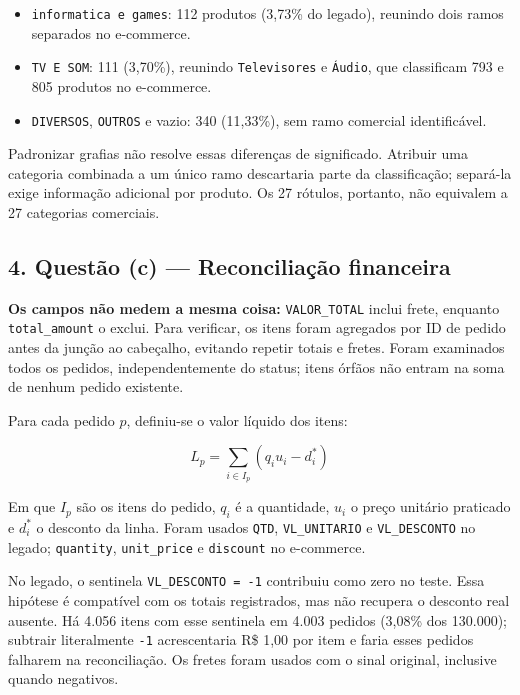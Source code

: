 \documentclass[
]{article}
\providecommand{\tightlist}{%
  \setlength{\itemsep}{0pt}\setlength{\parskip}{0pt}}
\begin{document}
\begin{itemize}
\tightlist
\item
  \texttt{informatica\ e\ games}: 112 produtos (3,73\% do legado),
  reunindo dois ramos separados no e-commerce.
\item
  \texttt{TV\ E\ SOM}: 111 (3,70\%), reunindo \texttt{Televisores} e
  \texttt{Áudio}, que classificam 793 e 805 produtos no e-commerce.
\item
  \texttt{DIVERSOS}, \texttt{OUTROS} e vazio: 340 (11,33\%), sem ramo
  comercial identificável.
\end{itemize}

Padronizar grafias não resolve essas diferenças de significado. Atribuir
uma categoria combinada a um único ramo descartaria parte da
classificação; separá-la exige informação adicional por produto. Os 27
rótulos, portanto, não equivalem a 27 categorias comerciais.

\subsection{4. Questão (c) --- Reconciliação
financeira}\label{questuxe3o-c-reconciliauxe7uxe3o-financeira}

\textbf{Os campos não medem a mesma coisa:} \texttt{VALOR\_TOTAL} inclui
frete, enquanto \texttt{total\_amount} o exclui. Para verificar, os
itens foram agregados por ID de pedido antes da junção ao cabeçalho,
evitando repetir totais e fretes. Foram examinados todos os pedidos,
independentemente do status; itens órfãos não entram na soma de nenhum
pedido existente.

Para cada pedido \(p\), definiu-se o valor líquido dos itens:

\[L_p = \sum_{i \in I_p} (q_i u_i - d_i^*)\]

Em que \(I_p\) são os itens do pedido, \(q_i\) é a quantidade, \(u_i\) o
preço unitário praticado e \(d_i^*\) o desconto da linha. Foram usados
\texttt{QTD}, \texttt{VL\_UNITARIO} e \texttt{VL\_DESCONTO} no legado;
\texttt{quantity}, \texttt{unit\_price} e \texttt{discount} no
e-commerce.

No legado, o sentinela \texttt{VL\_DESCONTO\ =\ -1} contribuiu como zero
no teste. Essa hipótese é compatível com os totais registrados, mas não
recupera o desconto real ausente. Há 4.056 itens com esse sentinela em
4.003 pedidos (3,08\% dos 130.000); subtrair literalmente \texttt{-1}
acrescentaria R\$ 1,00 por item e faria esses pedidos falharem na
reconciliação. Os fretes foram usados com o sinal original, inclusive
quando negativos.
\end{document}
